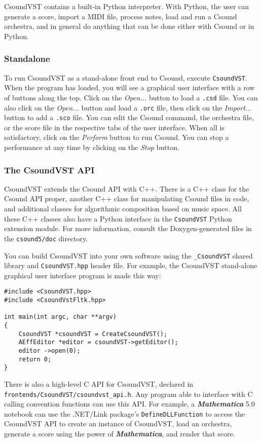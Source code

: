 \documentclass[10pt,letterpaper,onecolumn]{ltxguide}
\begin{document}
CsoundVST contains a built-in Python interpreter. With Python, the user can generate a score, import a MIDI file, process notes, load and run a Csound orchestra, and in general do anything that can be done either with Csound or in Python.

\subsubsection{Standalone}

To run CsoundVST as a stand-alone front end to Csound, execute \texttt{CsoundVST}. When the program has loaded, you will see a graphical user interface with a row of buttons along the top. Click on the \emph{Open...} button to load a \texttt{.csd} file. You can also click on the \emph{Open...} button and load a \texttt{.orc} file, then click on the \emph{Import...} button to add a \texttt{.sco} file. You can edit the Csound command, the orchestra file, or the score file in the respective tabs of the user interface. When all is satisfactory, click on the \emph{Perform} button to run Csound. You can stop a performance at any time by clicking on the \emph{Stop} button.

\subsubsection{The CsoundVST API}

CsoundVST extends the Csound API with C++. There is a C++ class for the Csound API proper, another C++ class for manipulating Csound files in code, and additional classes for algorithmic composition based on music space. All these C++ classes also have a Python interface in the \texttt{CsoundVST} Python extension module. For more information, consult the Doxygen-generated files in the \texttt{csound5/doc} directory.

You can build CsoundVST into your own software using the \texttt{\_CsoundVST} shared library and \texttt{CsoundVST.hpp} header file. For example, the CsoundVST stand-alone graphical user interface program is made this way:

\begin{verbatim}
#include <CsoundVST.hpp>
#include <CsoundVstFltk.hpp>

int main(int argc, char **argv)
{
    CsoundVST *csoundVST = CreateCsoundVST();
    AEffEditor *editor = csoundVST->getEditor();
    editor ->open(0);
    return 0;
}
\end{verbatim}

There is also a high-level C API for CsoundVST, declared in \linebreak[4] \texttt{frontends/CsoundVST/csoundvst\_api.h}. Any program able to interface with C calling convention functions can use this API. For example, a \textbf{\emph{Mathematica}} 5.0 notebook can use the .NET/Link package's \texttt{DefineDLLFunction} to access the CsoundVST API to create an instance of CsoundVST, load an orchestra, generate a score using the power of \textbf{\emph{Mathematica}}, and render that score.
\end{document}
